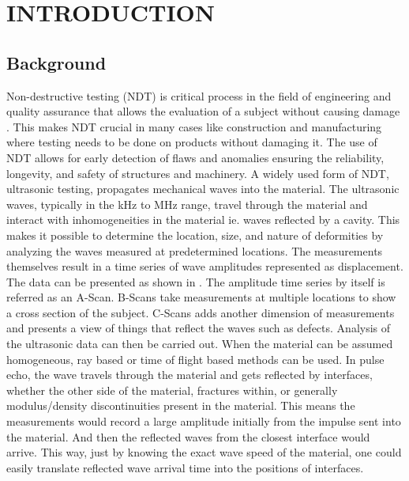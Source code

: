 \chapter{INTRODUCTION}
\section{Background}
\label{sec:background} %

\noindent Non-destructive testing (NDT) is critical process in the field of engineering and quality assurance that allows the evaluation of a subject without causing damage \autocite{howell2020nondestructive, maioUltrasoundPropagationComposite2022, bochudSparseDigitalSignal2015}. This makes NDT crucial in many cases like construction and manufacturing where testing needs to be done on products without damaging it. The use of NDT allows for early detection of flaws and anomalies ensuring the reliability, longevity, and safety of structures and machinery. A widely used form of NDT, ultrasonic testing, propagates mechanical waves into the material. The ultrasonic waves, typically in the kHz to MHz range, travel through the material and interact with inhomogeneities in the material ie. waves reflected by a cavity. This makes it possible to determine the location, size, and nature of deformities by analyzing the waves measured at predetermined locations. The measurements themselves result in a time series of wave amplitudes represented as displacement. The data can be presented as shown in . The amplitude time series by itself is referred as an A-Scan. B-Scans take measurements at multiple locations to show a cross section of the subject. C-Scans adds another dimension of measurements and presents a view of things that reflect the waves such as defects. Analysis of the ultrasonic data can then be carried out. When the material can be assumed homogeneous, ray based or time of flight based methods can be used. In pulse echo, the wave travels through the material and gets reflected by interfaces, whether the other side of the material, fractures within, or generally modulus/density discontinuities present in the material. This means the measurements would record a large amplitude initially from the impulse sent into the material. And then the reflected waves from the closest interface would arrive. This way, just by knowing the exact wave speed of the material, one could easily translate reflected wave arrival time into the positions of interfaces.

